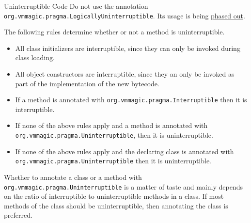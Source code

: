\begin{section}{Uninterruptible Code}
Do not use the annotation \texttt{org.vm\-ma\-gic.prag\-ma.Lo\-gi\-cal\-ly\-Un\-in\-ter\-rup\-ti\-b\-le}. Its usage is being \href{https://xtenlang.atlassian.net/browse/RVM-115}{phased out}.

The following rules determine whether or not a method is uninterruptible.
\begin{itemize}
  \item All class initializers are interruptible, since they can only be invoked during class loading.
  \item All object constructors are interruptible, since they an only be invoked as part of the implementation of the new bytecode.
  \item If a method is annotated with \texttt{org.vm\-ma\-gic.prag\-ma.In\-ter\-rup\-ti\-ble} then it is interruptible.
  \item If none of the above rules apply and a method is annotated with \texttt{org.vm\-ma\-gic.prag\-ma.Un\-in\-ter\-rup\-ti\-ble}, then it is uninterruptible.
  \item If none of the above rules apply and the declaring class is annotated with \texttt{org.vm\-ma\-gic.prag\-ma.Un\-in\-ter\-rup\-ti\-ble} then it is uninterruptible.
\end{itemize}

Whether to annotate a class or a method with \texttt{org.vm\-ma\-gic.prag\-ma.Un\-in\-ter\-rup\-ti\-ble} is a matter of taste and mainly depends on the ratio of interruptible to uninterruptible methods in a class. If most methods of the class should be uninterruptible, then annotating the class is preferred.

\end{section}
